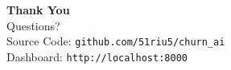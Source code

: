 \documentclass[aspectratio=169,11pt]{beamer}
\begin{document}

\begin{frame}[plain]
\begin{center}
\vspace{2cm}
{\Huge\bfseries Thank You}\\[12pt]
{\large Questions?}\\[20pt]
{\small\color{gray} Source Code: \texttt{github.com/51riu5/churn\_ai}}\\[4pt]
{\small\color{gray} Dashboard: \texttt{http://localhost:8000}}
\end{center}
\end{frame}
\end{document}
